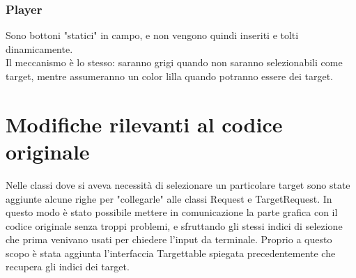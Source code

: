 \documentclass[a4paper]{article}
\begin{document}
	\subsubsection{Player}
	Sono bottoni "statici" in campo, e non vengono quindi inseriti e tolti dinamicamente.
	\\Il meccanismo è lo stesso: saranno grigi quando non saranno selezionabili come target, mentre assumeranno un color lilla quando potranno essere dei target.


	\section{Modifiche rilevanti al codice originale}
	Nelle classi dove si aveva necessità di selezionare un particolare target sono state aggiunte alcune righe per "collegarle" alle classi Request e TargetRequest.
    	In questo modo è stato possibile mettere in comunicazione la parte grafica con il codice originale senza troppi problemi, e sfruttando gli stessi indici di selezione che prima venivano
    	usati per chiedere l'input da terminale.
    	Proprio a questo scopo è stata aggiunta l'interfaccia Targettable spiegata precedentemente che recupera gli indici dei target.


	
\end{document}
